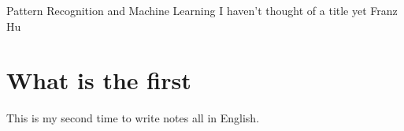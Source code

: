 \documentclass{../../bjhh} %
\begin{document}
\pagestyle{empty} %

\makemytitle
    {Pattern Recognition and Machine Learning}
    {I haven't thought of a title yet}
    {Franz Hu} 

\section*{What is the first}
This is my second time to write notes all in English.


\newpage
\tableofcontents
\newpage

\pagestyle{fancy} %
\setcounter{page}{1}

\end{document}
